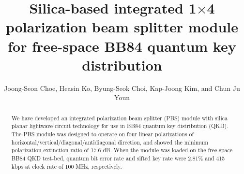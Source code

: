 \documentclass[letterpaper, 10pt]{article}
\begin{document}
\title{Silica-based integrated 1$\times$4 polarization beam splitter module for free-space BB84 quantum key distribution}
\author{Joong-Seon Choe, Heasin Ko, Byung-Seok Choi, Kap-Joong Kim, and Chun Ju Youn}
\address{Electronics and Telecommunications Research Institute, Daejeon 34129, Korea}
\begin{abstract}
We have developed an integrated polarization beam splitter (PBS) module with silica planar lightwave circuit technology for use in BB84 quantum key distribution (QKD).
The PBS module was designed to operate on four linear polarizations of horizontal/vertical/diagonal/antidiagonal direction, and showed the minimum polarization extinction ratio of 17.6 dB.
When the module was loaded on the free-space BB84 QKD test-bed, quantum bit error rate and sifted key rate  were 2.81\% and 415 kbps at clock rate of 100 MHz, respectively.
\end{abstract}





\end{document}
